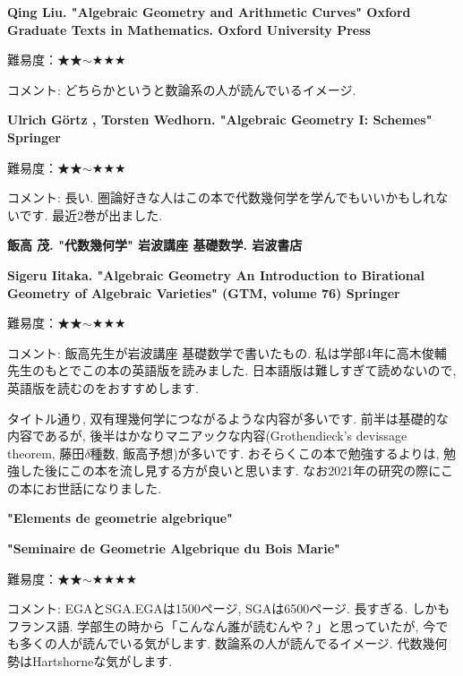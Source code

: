 \textbf{Qing Liu. "Algebraic Geometry and Arithmetic Curves" Oxford Graduate Texts in Mathematics. Oxford University Press}

難易度：★★$\sim$★★★  \vspace{-6pt}

コメント: どちらかというと数論系の人が読んでいるイメージ. 
\vspace{8pt}

\textbf{Ulrich G\"ortz , Torsten Wedhorn. "Algebraic Geometry I: Schemes" Springer}

難易度：★★$\sim$★★★  \vspace{-6pt}

コメント: 長い. 圏論好きな人はこの本で代数幾何学を学んでもいいかもしれないです. 最近2巻が出ました. 
\vspace{8pt}

\textbf{飯高 茂. "代数幾何学" 岩波講座 基礎数学. 岩波書店} \vspace{-6pt}

\textbf{Sigeru Iitaka. "Algebraic Geometry
An Introduction to Birational Geometry of Algebraic Varieties"  (GTM, volume 76) Springer} \vspace{-6pt}

難易度：★★$\sim$★★★  \vspace{-6pt} 

コメント: 飯高先生が岩波講座 基礎数学で書いたもの. 私は学部4年に高木俊輔先生のもとでこの本の英語版を読みました. 日本語版は難しすぎて読めないので, 英語版を読むのをおすすめします.

タイトル通り, 双有理幾何学につながるような内容が多いです. %
前半は基礎的な内容であるが, 後半はかなりマニアックな内容(Grothendieck's devissage theorem, 藤田$\delta$種数, 飯高予想)が多いです. おそらくこの本で勉強するよりは, 勉強した後にこの本を流し見する方が良いと思います. なお2021年の研究の際にこの本にお世話になりました.
\vspace{8pt}


\textbf{"Elements de geometrie algebrique"} \vspace{-6pt}

\textbf{"Seminaire de Geometrie Algebrique du Bois Marie"} \vspace{-6pt}

難易度：★★$\sim$★★★★  \vspace{-6pt} 

コメント:  EGAとSGA.EGAは1500ページ, SGAは6500ページ. 長すぎる. しかもフランス語. 
学部生の時から「こんなん誰が読むんや？」と思っていたが, 今でも多くの人が読んでいる気がします. 数論系の人が読んでるイメージ. 代数幾何勢はHartshorneな気がします. 

